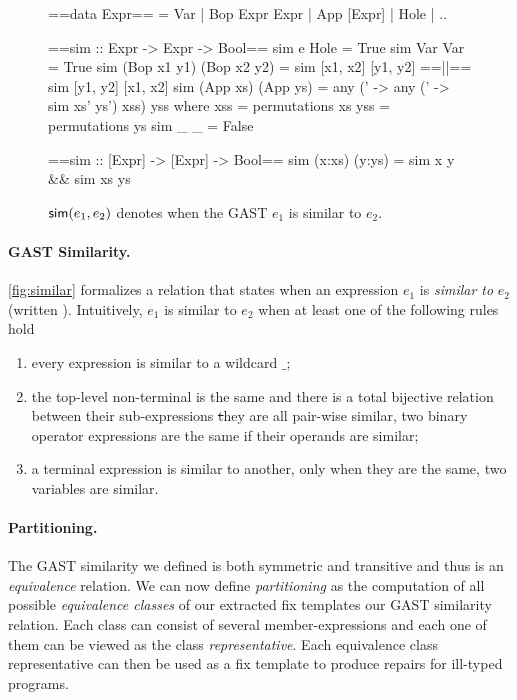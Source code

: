 \label{subsec:partitioning}
\begin{figure*}
\begin{minipage}{\textwidth}
\begin{haskellcode}
==data Expr== = Var | Bop Expr Expr | App [Expr] | Hole | ..

==sim :: Expr -> Expr -> Bool==
sim e           Hole        = True
sim Var         Var         = True
sim (Bop x1 y1) (Bop x2 y2) = sim [x1, x2] [y1, y2] ==||== sim [y1, y2] [x1, x2]
sim (App xs)    (App ys)    = any (\ys' -> any (\xs' -> sim xs' ys') xss) yss
    where
        xss = permutations xs
        yss = permutations ys
sim _           _           = False

==sim :: [Expr] -> [Expr] -> Bool==
sim (x:xs) (y:ys) = sim x y && sim xs ys
\end{haskellcode}
\end{minipage}
\caption{$\mathsf{sim}(e_1, e_2)$ denotes when the GAST $e_1$ is similar to $e_2$.}
\label{fig:similar}
\end{figure*}

\paragraph{GAST Similarity.}
%
\autoref{fig:similar} formalizes a relation that states when
an expression $e_1$ is \emph{similar to} $e_2$  (written ).
%
Intuitively, $e_1$ is similar to $e_2$ when at least one of the following rules
hold
\begin{enumerate}
    \item every expression is similar to a wildcard $\_$;

    \item the top-level non-terminal is the same and there is a total bijective
        relation between their sub-expressions \st they are all pair-wise
        similar, \eg two binary operator expressions are the same if their
        operands are similar;

    \item a terminal expression is similar to another, only when they are the
    same, \eg two variables are similar.
\end{enumerate}
%


\paragraph{Partitioning.}
The GAST similarity we defined is both symmetric and transitive and thus is an
\emph{equivalence} relation. We can now define \emph{partitioning} as the
computation of all possible \emph{equivalence classes} of our extracted fix
templates \wrt our GAST similarity relation. Each class can consist of several
member-expressions and each one of them can be viewed as the class
\emph{representative}. Each equivalence class representative can then be used as
a fix template to produce repairs for ill-typed programs.

